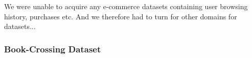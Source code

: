 We were unable to acquire any e-commerce datasets containing user browsing history, purchases etc. And we therefore had to turn for other domains for datasets...


\subsubsection{Book-Crossing Dataset}




